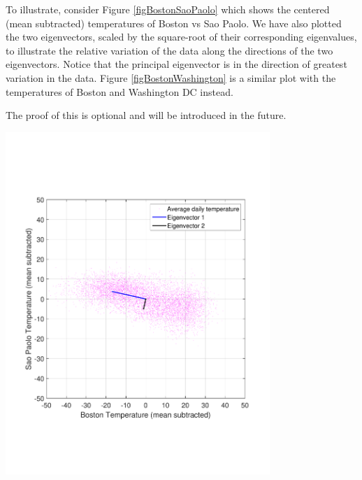 To illustrate, consider Figure \ref{figBostonSaoPaolo} which shows the centered (mean subtracted) temperatures of Boston vs Sao Paolo. We have also plotted  the two eigenvectors, scaled by the square-root of their corresponding eigenvalues, to illustrate the relative variation of the data along the directions of the two eigenvectors. Notice that the principal eigenvector is in the direction of greatest variation in the data. Figure \ref{figBostonWashington} is a similar plot with the temperatures of Boston and Washington DC instead.

The proof of this is optional and will be introduced in the future.

\begin{center}
\includegraphics[width=0.75\textwidth]{FacesNight5/figs/BostonSaoPaoloCentered.pdf}
\label{figBostonSaoPaolo}
\end{center}

